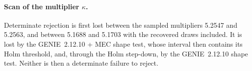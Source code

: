 \paragraph{Scan of the multiplier $\kappa$.} Determinate rejection is first lost between the sampled multipliers 5.2547 and 5.2563, and between 5.1688 and 5.1703 with the recovered draws included. It is lost by the GENIE~2.12.10 + MEC shape test, whose interval then contains its Holm threshold, and, through the Holm step-down, by the GENIE~2.12.10 shape test. Neither is then a determinate failure to reject.

